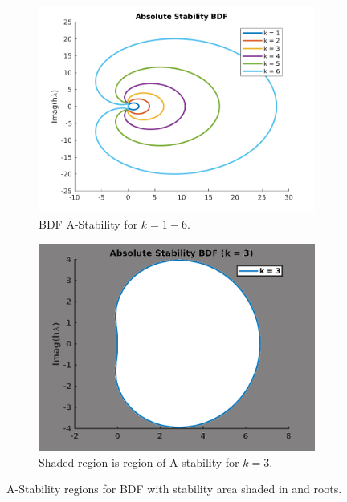 \documentclass[12pt]{article}
\theoremstyle{remark}
\begin{document}
\vspace{1cm}

\begin{figure}[H]
	\centering
	\begin{subfigure}{.55\textwidth}
		\centering
		\includegraphics[width=1\linewidth]{5_2_2_1.png}
		\caption{BDF A-Stability for $k = 1-6.$}
		\label{fig:sub1}
	\end{subfigure}%
	\begin{subfigure}{.55\textwidth}
		\centering
		\includegraphics[width=1\linewidth]{5_2_2_1_single.png}
		\caption{Shaded region is region of A-stability for $k = 3.$}
		\label{fig:sub2}
	\end{subfigure}
	\caption{A-Stability regions for BDF  with stability area shaded in and roots.}
	\label{fig:test}
\end{figure}
\end{document}
